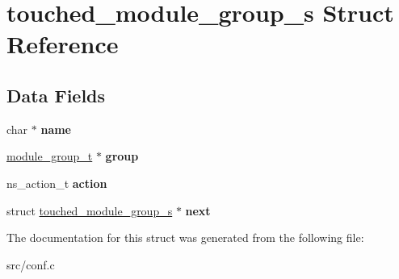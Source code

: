 \hypertarget{structtouched__module__group__s}{}\section{touched\+\_\+module\+\_\+group\+\_\+s Struct Reference}
\label{structtouched__module__group__s}
\subsection*{Data Fields}
\begin{DoxyCompactItemize}
\item 
\mbox{\label{structtouched__module__group__s_a358640aeff5b1f4ff8b6e67d0b1b1d15}} 
char $\ast$ {\bfseries name}
\item 
\mbox{\label{structtouched__module__group__s_a8432361c723ee7077bbe9c370b170b94}} 
\hyperlink{structmodule__group__s}{module\+\_\+group\+\_\+t} $\ast$ {\bfseries group}
\item 
\mbox{\label{structtouched__module__group__s_a9fdf1eb221bb506a4504e276e3f44ece}} 
ns\+\_\+action\+\_\+t {\bfseries action}
\item 
\mbox{\label{structtouched__module__group__s_a7fa1f9d8f0a6492e4de2cf899a9b7723}} 
struct \hyperlink{structtouched__module__group__s}{touched\+\_\+module\+\_\+group\+\_\+s} $\ast$ {\bfseries next}
\end{DoxyCompactItemize}


The documentation for this struct was generated from the following file\+:\begin{DoxyCompactItemize}
\item 
src/conf.\+c\end{DoxyCompactItemize}
